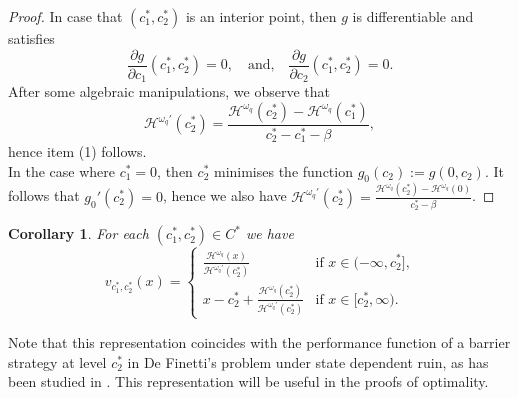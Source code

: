 \documentclass[11pt,reqno]{amsart}
\newtheorem{corollary}{Corollary}[section]
\newcommand{\cH}{\mathcal{H}}
\newcommand{\homega}{\omega_q}
\begin{document}
\begin{proof}
	In case that $(c_1^\ast,c_2^\ast)$ is an interior point, then $g$ is differentiable and satisfies
	\[
	\frac{\partial g}{\partial c_1}(c_1^\ast,c_2^\ast) = 0, \quad\text{and,}\quad \frac{\partial g}{\partial c_2}(c_1^\ast,c_2^\ast)=0.
	\]
	After some algebraic manipulations, we observe that
	\[
	\cH^{\homega\prime}(c_2^\ast) = \frac{\cH^{\homega}(c_2^\ast) - \cH^{\homega}(c_1^\ast)}{c_2^\ast-c_1^\ast-\beta},
	\]
	hence item (1) follows.\\
	In the case where $c_1^\ast=0$, then $c_2^\ast$ minimises the function $g_0(c_2):= g(0,c_2)$. It follows that $g_0'(c_2^\ast)=0$, hence we also have $\cH^{\homega\prime}(c_2^\ast) = \frac{\cH^{\homega}(c_2^\ast) - \cH^{\homega}(0)}{c_2^\ast-\beta}$.
\end{proof}
\begin{corollary}\label{cor_definetti}
	For each $(c_1^\ast,c_2^\ast)\in C^\ast$ we have
	\[
	v_{c_1^\ast,c_2^\ast}(x) = \begin{cases}
		 \frac{\cH^{\homega}(x)}{\cH^{\homega\prime}(c_2^\ast)} & \text{if $x \in (-\infty,c_2^\ast]$,} \\
		x-c_2^\ast + \frac{\cH^{\homega}(c_2^\ast)}{\cH^{\homega\prime}(c_2^\ast)} & \text{if $x \in [c_2^\ast, \infty)$.}
	\end{cases}
	\]
\end{corollary}
Note that this representation coincides with the performance function of a barrier strategy at level $c_2^\ast$ in De Finetti's problem under state dependent ruin, as has been studied in \cite{mata-renaud_2024}. This representation will be useful in the proofs of optimality.
\end{document}
